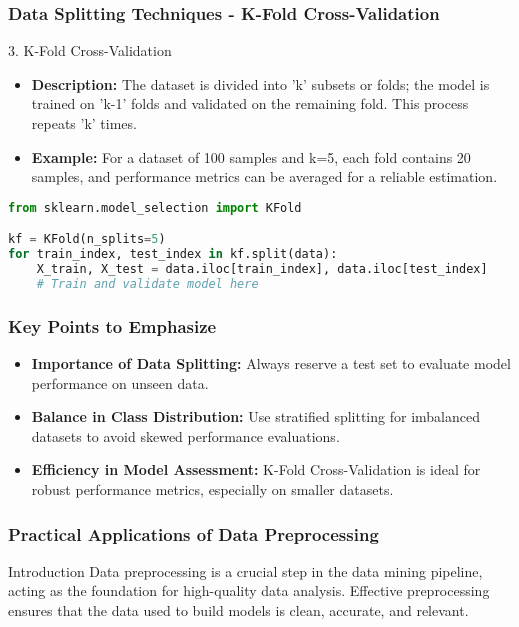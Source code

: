 \documentclass{beamer}
\begin{document}
\begin{frame}[fragile]
    \frametitle{Data Splitting Techniques - K-Fold Cross-Validation}
    \begin{block}{3. K-Fold Cross-Validation}
        \begin{itemize}
            \item \textbf{Description:} The dataset is divided into 'k' subsets or folds; the model is trained on 'k-1' folds and validated on the remaining fold. This process repeats 'k' times.
            \item \textbf{Example:} For a dataset of 100 samples and k=5, each fold contains 20 samples, and performance metrics can be averaged for a reliable estimation.
        \end{itemize}
    \end{block}
    \begin{lstlisting}[language=Python]
from sklearn.model_selection import KFold

kf = KFold(n_splits=5)
for train_index, test_index in kf.split(data):
    X_train, X_test = data.iloc[train_index], data.iloc[test_index]
    # Train and validate model here
    \end{lstlisting}
\end{frame}

\begin{frame}[fragile]
    \frametitle{Key Points to Emphasize}
    \begin{itemize}
        \item \textbf{Importance of Data Splitting:} Always reserve a test set to evaluate model performance on unseen data.
        \item \textbf{Balance in Class Distribution:} Use stratified splitting for imbalanced datasets to avoid skewed performance evaluations.
        \item \textbf{Efficiency in Model Assessment:} K-Fold Cross-Validation is ideal for robust performance metrics, especially on smaller datasets.
    \end{itemize}
\end{frame}

\begin{frame}[fragile]
    \frametitle{Practical Applications of Data Preprocessing}
    \begin{block}{Introduction}
        Data preprocessing is a crucial step in the data mining pipeline, acting as the foundation for high-quality data analysis. Effective preprocessing ensures that the data used to build models is clean, accurate, and relevant.
    \end{block}
\end{frame}
\end{document}
